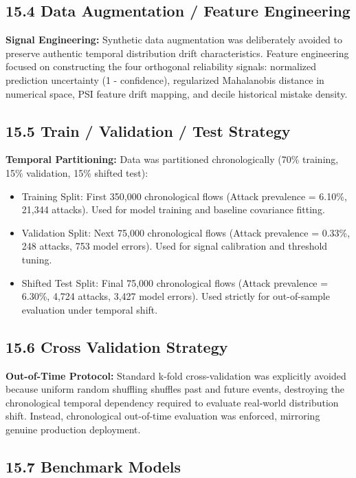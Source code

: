\subsection{15.4 Data Augmentation / Feature Engineering}

\textbf{Signal Engineering:} Synthetic data augmentation was deliberately avoided to preserve authentic temporal distribution drift characteristics. Feature engineering focused on constructing the four orthogonal reliability signals: normalized prediction uncertainty (1 - confidence), regularized Mahalanobis distance in numerical space, PSI feature drift mapping, and decile historical mistake density.

\subsection{15.5 Train / Validation / Test Strategy}

\textbf{Temporal Partitioning:} Data was partitioned chronologically (70\% training, 15\% validation, 15\% shifted test):

\begin{itemize}
\item Training Split: First 350,000 chronological flows (Attack prevalence = 6.10\%, 21,344 attacks). Used for model training and baseline covariance fitting.
\item Validation Split: Next 75,000 chronological flows (Attack prevalence = 0.33\%, 248 attacks, 753 model errors). Used for signal calibration and threshold tuning.
\item Shifted Test Split: Final 75,000 chronological flows (Attack prevalence = 6.30\%, 4,724 attacks, 3,427 model errors). Used strictly for out-of-sample evaluation under temporal shift.
\end{itemize}

\subsection{15.6 Cross Validation Strategy}

\textbf{Out-of-Time Protocol:} Standard k-fold cross-validation was explicitly avoided because uniform random shuffling shuffles past and future events, destroying the chronological temporal dependency required to evaluate real-world distribution shift. Instead, chronological out-of-time evaluation was enforced, mirroring genuine production deployment.

\subsection{15.7 Benchmark Models}

